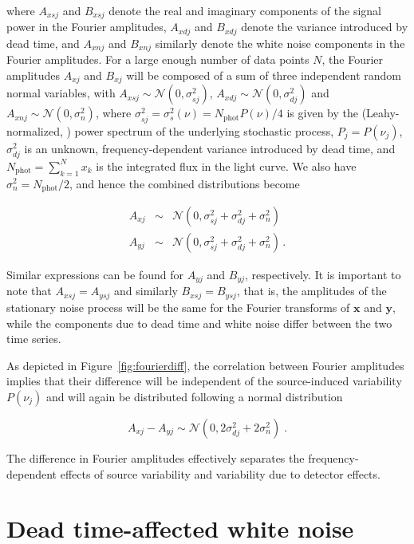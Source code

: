 \documentclass[twocolumn]{aastex61}
\newcommand{\Normal}{\ensuremath{{\mathcal N}}}
\begin{document}
\noindent where $A_{xsj}$ and $B_{xsj}$ denote the real and imaginary components of the signal power in the Fourier amplitudes,  $A_{xdj}$ and $B_{xdj}$ denote the variance introduced by dead time, and $A_{xnj}$ and $B_{xnj}$ similarly denote the white noise components in the Fourier amplitudes.
For a large enough number of data points $N$, the Fourier amplitudes $A_{xj}$ and $B_{xj}$ will be composed of a sum of three independent random normal variables, with $A_{xsj} \sim \Normal(0, \sigma_{sj}^2)$,  $A_{xdj} \sim \Normal(0, \sigma_{dj}^2)$ and $A_{xnj} \sim \Normal(0, \sigma_n^2)$, where $\sigma_{sj}^2 = \sigma_{s}^2(\nu) = N_\mathrm{phot}P(\nu)/4$ is given by the (Leahy-normalized, \citealt{Leahy+83}) power spectrum of the underlying stochastic process, $P_j = P(\nu_j)$, $\sigma_{dj}^2$ is an unknown, frequency-dependent variance introduced by dead time, and $N_{\mathrm{phot}} = \sum_{k=1}^{N}{x_k}$ is the integrated flux in the light curve. We also have $\sigma_n^2 = N_\mathrm{phot}/2$, and hence the combined distributions become

\begin{eqnarray}
A_{xj} &\sim & \Normal(0, \sigma_{sj}^2 + \sigma_{dj}^2 + \sigma_{n}^2) \nonumber \\
A_{yj} &\sim & \Normal(0, \sigma_{sj}^2 + \sigma_{dj}^2 + \sigma_{n}^2) \nonumber \, .
\end{eqnarray}

\noindent Similar expressions can be found for $A_{yj}$ and $B_{yj}$, respectively. It is important to note that $A_{xsj} = A_{ysj}$ and similarly $B_{xsj} = B_{ysj}$, that is, the amplitudes of the stationary noise process will be the same for the Fourier transforms of $\mathbf{x}$ and $\mathbf{y}$, while the components due to dead time and white noise differ between the two time series.

As depicted in Figure~\ref{fig:fourierdiff}, the correlation between Fourier amplitudes implies that their difference will be independent of the source-induced variability $P(\nu_j)$ and will again be distributed following a normal distribution 

\[
A_{xj} - A_{yj} \sim \Normal(0, 2\sigma_{dj}^2 + 2\sigma_{n}^2) \; .
\]

\noindent The difference in Fourier amplitudes effectively separates the frequency-dependent effects of source variability and variability due to detector effects.
 
\section{Dead time-affected white noise} \label{sec:wndeadtime}
\end{document}
